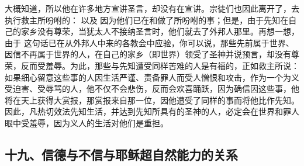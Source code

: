 大概知道，所以他在许多地方宣讲圣言，却没有在宣讲。宗徒们也因此离开了，去执行救主所吩咐的：  以及  因为他们已在和做了所吩咐的事；但是，由于先知在自己的家乡没有尊荣，当犹太人不接纳圣言时，他们就去了外邦人那里。再想一想，由于  这句话已在从外邦人中来的各教会中应验，你可以说，那些先前属于世界、因信不再属于世界的人，在自己的家乡（即世界）领受了圣神并说预言，却没有尊荣，反而受羞辱。为此，那些与先知遭受同样苦难的人是有福的，正如救主所说：  如果细心留意这些事的人因生活严谨、责备罪人而受人憎恨和攻击，作为一个为义受迫害、受辱骂的人，他不仅不会悲伤，反而会欢喜踊跃，因为确信因这些事，他将在天上获得大赏报，那赏报来自那一位，因他遭受了同样的事而将他比作先知。因此，凡热切效法先知生活，并达到先知所具有的圣神的人，必定会在世界和罪人眼中受羞辱，因为义人的生活对他们是重担。\par


\subsection{十九、信德与不信与耶稣超自然能力的关系}

